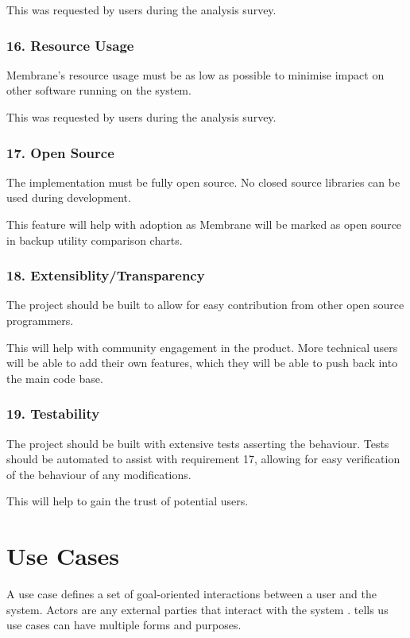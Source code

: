 \documentclass[11pt, a4paper, twoside]{report}
\begin{document}
This was requested by users during the analysis survey.

\subsubsection{16. Resource Usage}
Membrane's resource usage must be as low as possible to minimise impact on other software running on the system.

This was requested by users during the analysis survey.

\subsubsection{17. Open Source}

The implementation must be fully open source. No closed source libraries can be used during development.

This feature will help with adoption as Membrane will be marked as open source in backup utility comparison charts.

\subsubsection{18. Extensiblity/Transparency}

The project should be built to allow for easy contribution from other open source programmers.

This will help with community engagement in the product. More technical users will be able to add their own features, which they will be able to push back into the main code base.

\subsubsection{19. Testability}

The project should be built with extensive tests asserting the behaviour. Tests should be automated to assist with requirement 17, allowing for easy verification of the behaviour of any modifications.

This will help to gain the trust of potential users.

\clearpage

\section{Use Cases}

A use case defines a set of goal-oriented interactions between a user and the system. Actors are any external parties that interact with the system \citep{malan2001functional}. \cite{cockburn1997structuring} tells us use cases can have multiple forms and purposes.
\end{document}
